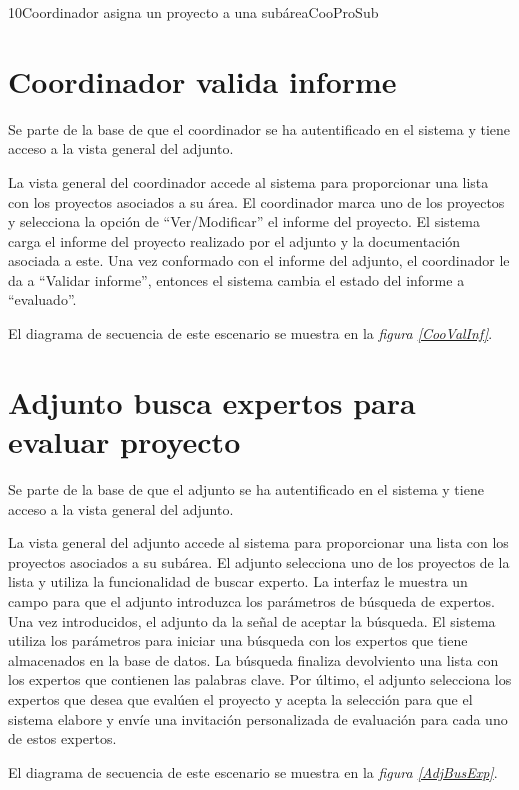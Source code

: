 \documentclass[11pt,a4paper,spanish,twoside]{book}
\begin{document}
{10}{Coordinador asigna un proyecto a una subárea}{CooProSub}

\section{Coordinador valida informe}
Se parte de la base de que el coordinador se ha autentificado en el sistema y
tiene acceso a la vista general del adjunto.

La vista general del coordinador accede al sistema para proporcionar una
lista con los proyectos asociados a su área. El coordinador marca uno
de los proyectos y selecciona la opción de ``Ver/Modificar'' el informe del
proyecto. El sistema carga el informe del proyecto realizado por el adjunto
y la documentación asociada a este. Una vez conformado con el informe del
adjunto, el coordinador le da a ``Validar informe'', entonces el sistema
cambia el estado del informe a ``evaluado''.

El diagrama de secuencia de este escenario se muestra en la \emph{figura
\ref{CooValInf}}.


\section{Adjunto busca expertos para evaluar proyecto}
Se parte de la base de que el adjunto se ha autentificado en el sistema y
tiene acceso a la vista general del adjunto.

La vista general del adjunto accede al sistema para proporcionar una lista
con los proyectos asociados a su subárea. El adjunto selecciona uno de los
proyectos de la lista y utiliza la funcionalidad de buscar experto. La 
interfaz le muestra un campo para que el adjunto introduzca los parámetros de
búsqueda de expertos. Una vez introducidos, el adjunto da la señal de
aceptar la búsqueda. El sistema utiliza los parámetros para iniciar una 
búsqueda con los expertos que tiene almacenados en la base de datos. La
búsqueda finaliza devolviento una lista con los expertos que contienen las
palabras clave. Por último, el adjunto selecciona los expertos que desea que
evalúen el proyecto y acepta la selección para que el sistema elabore y
envíe una invitación personalizada de evaluación para cada uno de estos
expertos.

El diagrama de secuencia de este escenario se muestra en la \emph{figura
\ref{AdjBusExp}}.
\end{document}
